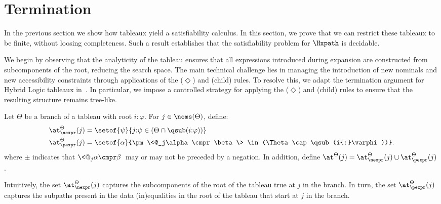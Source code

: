 \section{Termination}\label{sec:termination}

In the previous section we show how tableaux yield a satisfiability calculus.
In this section, we prove that we can restrict these tableaux to be finite, without loosing completeness.
Such a result establishes that the satisfiability problem for $\Hxpath$ is decidable.

We begin by observing that the analyticity of the tableau ensures that all expressions introduced during expansion are constructed from subcomponents of the root, reducing the search space. 
The main technical challenge lies in managing the introduction of new nominals and new accessibility constraints through applications of the ($\Diamond$) and (child) rules. 
To resolve this, we adapt the termination argument for Hybrid Logic tableaux in~\cite{BolanderB07}. In particular, we impose a controlled strategy for applying the ($\Diamond$) and (child) rules to ensure that the resulting structure remains tree-like. 

\begin{defi}
  \label{def:atform}
  Let $\Theta$ be a branch of a tableau with root $i{:}\varphi$.
  For $j \in \noms(\Theta)$, define:
  \begin{align*}
    \at_{\nexpr}^{\Theta}(j) & = \setof{\psi}{{j{:}\psi} \in (\Theta \cap \qsub(i{:}\varphi))} \\
    \at_{\pexpr}^{\Theta}(j) & = \setof{\alpha}{\pm \<@_j\alpha \cmpr \beta \> \in (\Theta \cap \qsub(i{:}\varphi))}.
  \end{align*}
  where $\pm$ indicates that $\<@_j\alpha \cmpr \beta \>$ may or may not be preceded by a negation.
  In addition, define $\at^\Theta(j) = \at_{\nexpr}^{\Theta}(j) \cup \at_{\pexpr}^{\Theta}(j)$.
\end{defi}

Intuitively, the set $\at_{\nexpr}^{\Theta}(j)$ captures the subcomponents of the root of the tableau true at $j$ in the branch.
In turn, the set $\at_{\pexpr}^{\Theta}(j)$ captures the subpaths present in the data (in)equalities in the root of the tableau that start at $j$ in the branch.

